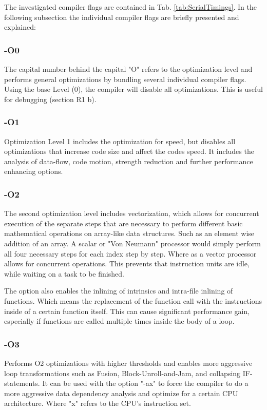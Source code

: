 \documentclass[a4paper, 11pt, oneside]{scrartcl}
\newcommand{\refTab}[1]{Tab. \ref{#1}}
\begin{document}
The investigated compiler flags are contained in \refTab{tab:SerialTimings}.
In the following subsection the individual compiler flags are briefly presented and explained: 
 
\subsubsection*{-O0}
The capital number behind the capital "O" refers to the optimization level and performs general optimizations by bundling several individual compiler flags. Using the base Level (0),  the compiler will disable all optimizations. This is useful for debugging (section R1 b).

\subsubsection*{-O1}
Optimization Level 1 includes the optimization for speed, but disables all optimizations that increase code size and affect the codes speed. It includes the analysis of data-flow, code motion, strength reduction and further performance enhancing options.

\subsubsection*{-O2}
The second optimization level includes vectorization, which allows for concurrent execution of the separate steps that are necessary to perform different basic mathematical operations on array-like data structures. Such as an element wise addition of an array. A scalar or "Von Neumann" processor would simply perform all four necessary steps for each index step by step. Where as a vector processor allows for concurrent operations. This prevents that instruction units are idle, while waiting on a task to be finished.

The option also enables the inlining of intrinsics and intra-file inlining of functions. Which means the replacement of the function call with the instructions inside of a certain function itself. This can cause significant performance gain, especially if functions are called multiple times inside the body of a loop.

\subsubsection*{-O3}
Performs O2 optimizations with higher thresholds and enables more aggressive loop transformations such as Fusion, Block-Unroll-and-Jam, and collapsing IF-statements. It can be used with the option "-ax" to force the compiler to do a more aggressive data dependency analysis and optimize for a certain CPU architecture. Where "x" refers to the CPU's instruction set.
\end{document}
